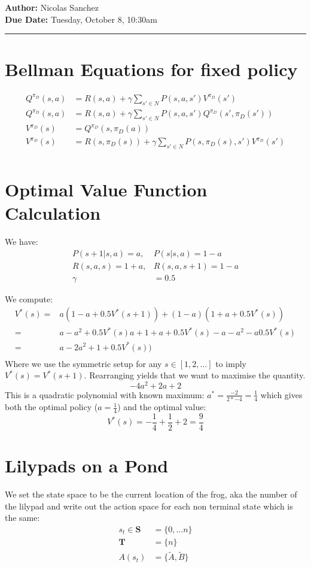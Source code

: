 \documentclass{article}[12pt]
\newcommand{\headings}[4]{\noindent {\bf Assignment 2 CME241} \hfill {{\bf Author:} Nicolas Sanchez} \\
{} \hfill {{\bf Due Date:} #2} \\

\rule[0.1in]{\textwidth}{0.025in}
}
\begin{document}
\headings{\#1}{Tuesday, October 8, 10:30am}\section{} 



\section{Bellman Equations for fixed policy}
\begin{align*}
Q^{\pi_D}(s,a) &= R(s,a) + \gamma \sum_{s'\in N} P(s,a,s')V^{\pi_D}(s')\\
Q^{\pi_D}(s,a) &= R(s,a) + \gamma \sum_{s'\in N} P(s,a,s')Q^{\pi_D}(s',\pi_D(s'))\\
V^{\pi_D}(s) &=  Q^{\pi_D}(s,\pi_D(a)) \\
V^{\pi_D}(s)  &= R(s,\pi_D(s)) + \gamma \sum_{s'\in N} P(s,\pi_D(s),s')V^{\pi_D}(s')\\
\end{align*}


\section{Optimal Value Function Calculation}

We have:
\begin{align*}
P(s+1|s,a) = a,&P(s|s,a) = 1-a\\
R(s,a,s) = 1+a,& R(s,a,s+1) = 1-a\\
\gamma &= 0.5
\end{align*}

We compute:
\begin{align*}
V^*(s) =&  a(1-a + 0.5V^*(s+1) ) + (1-a)(1+a + 0.5V^*(s)) \\
	=&a-a^2+0.5V^*(s)a + 1 + a + 0.5 V^*(s) - a - a^2-a0.5V^*(s)\\
	=&a-2a^2 + 1 + 0.5 V^*(s))\\	
\end{align*}
Where we use the symmetric setup for any $s\in[1,2,\ldots]$ to imply $V^*(s) = V^*(s+1)$. Rearranging yields that we want to maximise the quantity.
$$ -4a^2 + 2a + 2 $$
This is a quadratic polynomial with known maximum: $a^* = \frac{-2}{2*-4} = \frac{1}{4}$ which gives both the optimal policy ($a = \frac{1}{4}$) and the optimal value:
$$V^*(s) = -\frac{1}{4} + \frac{1}{2} + 2 = \frac{9}{4} $$


\section{Lilypads on a Pond}
We set the state space to be the current location of the frog, aka the number of the lilypad and write out the action space for each non terminal state which is the same:
\begin{align*}
s_t \in \mathbf{S}& =\{0,\ldots n\}\\
\mathbf{T}& = \{n\}\\
A(s_t) &= \{\tilde{A},\tilde{B}\}
\end{align*} 
\end{document}
